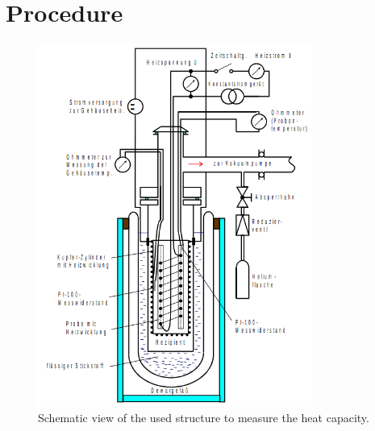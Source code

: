 \section{Procedure}
\label{sec:Durchführung}




\begin{figure}
    \centering
    \includegraphics[width=0.8\textwidth]{content/plots/aufbau.png}
    \caption{Schematic view of the used structure to measure the heat capacity.}
    \label{fig:aufbau}
\end{figure}